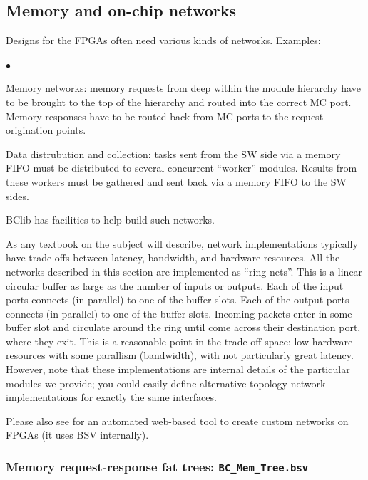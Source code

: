 \documentclass[twoside,letterpaper,11pt]{article}
\newenvironment{tightlist}%
{\begin{list}{$\bullet$}{%
    \setlength{\topsep}{0in}
    \setlength{\partopsep}{0in}
    \setlength{\itemsep}{0in}
    \setlength{\parsep}{0in}
    \setlength{\leftmargin}{1.5em}
    \setlength{\rightmargin}{0in}
    \setlength{\itemindent}{0in}
}
}%
{\end{list}
}
\begin{document}
\subsection{Memory and on-chip networks}

\label{sec_nocs}

Designs for the FPGAs often need various kinds of networks.  Examples:
\begin{tightlist}

\item Memory networks: memory requests from deep within the module
hierarchy have to be brought to the top of the hierarchy and routed
into the correct MC port.  Memory responses have to be routed back
from MC ports to the request origination points.

\item Data distrubution and collection: tasks sent from the SW side
via a memory FIFO must be distributed to several concurrent ``worker''
modules.  Results from these workers must be gathered and sent back
via a memory FIFO to the SW sides.

\end{tightlist}
BClib has facilities to help build such networks.

As any textbook on the subject will describe, network implementations
typically have trade-offs between latency, bandwidth, and hardware
resources.  All the networks described in this section are implemented
as ``ring nets''.  This is a linear circular buffer as large as the
number of inputs or outputs.  Each of the input ports connects (in
parallel) to one of the buffer slots.  Each of the output ports
connects (in parallel) to one of the buffer slots. Incoming packets
enter in some buffer slot and circulate around the ring until come
across their destination port, where they exit.  This is a reasonable
point in the trade-off space: low hardware resources with some
parallism (bandwidth), with not particularly great latency.  However,
note that these implementations are internal details of the particular
modules we provide; you could easily define alternative topology
network implementations for exactly the same interfaces.

Please also see \cite{Papamichael2012} for an automated web-based tool
to create custom networks on FPGAs (it uses BSV internally).


\subsubsection{Memory request-response fat trees: {\tt BC\_Mem\_Tree.bsv}}
\end{document}
